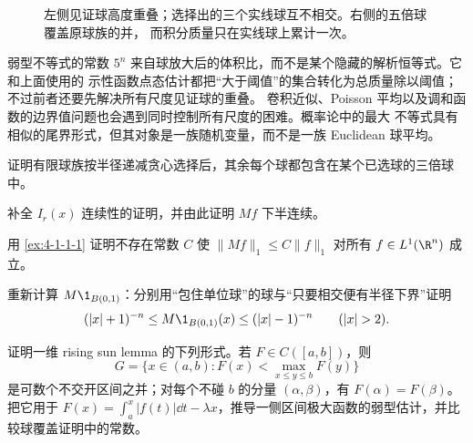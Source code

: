\begin{figure}[htbp]
\centering
{}
\caption{左侧见证球高度重叠；选择出的三个实线球互不相交。右侧的五倍球覆盖原球族的并，
而积分质量只在实线球上累计一次。}
\label{fig:4-1-vitali-5r}
\end{figure}

弱型不等式的常数 $5^n$ 来自球放大后的体积比，而不是某个隐藏的解析恒等式。它和上面使用的
示性函数点态估计都把“大于阈值”的集合转化为总质量除以阈值；不过前者还要先解决所有尺度见证球的重叠。
卷积近似、Poisson 平均以及调和函数的边界值问题也会遇到同时控制所有尺度的困难。概率论中的最大
不等式具有相似的尾界形式，但其对象是一族随机变量，而不是一族 Euclidean 球平均。

\begin{exercise}
证明有限球族按半径递减贪心选择后，其余每个球都包含在某个已选球的三倍球中。
\end{exercise}
\begin{exercise}
补全 $I_r(x)$ 连续性的证明，并由此证明 $Mf$ 下半连续。
\end{exercise}
\begin{exercise}
用 \cref{ex:4-1-1-1} 证明不存在常数 $C$ 使 $\|Mf\|_1\le C\|f\|_1$ 对所有
$f\in L^1(\R^n)$ 成立。
\end{exercise}
\begin{exercise}
重新计算 $M\1_{B(0,1)}$：分别用“包住单位球”的球与“只要相交便有半径下界”证明
\[
 (|x|+1)^{-n}\le M\1_{B(0,1)}(x)\le(|x|-1)^{-n}
 \qquad(|x|>2).
\]
\end{exercise}
\begin{exercise}
证明一维 rising sun lemma 的下列形式。若 $F\in C([a,b])$，则
\[
 G=\{x\in(a,b):F(x)<\max_{x\le y\le b}F(y)\}
\]
是可数个不交开区间之并；对每个不碰 $b$ 的分量 $(\alpha,\beta)$，有
$F(\alpha)=F(\beta)$。把它用于
$F(x)=\int_a^x|f(t)|\dd t-\lambda x$，推导一侧区间极大函数的弱型估计，并比较球覆盖证明中的常数。
\end{exercise}

